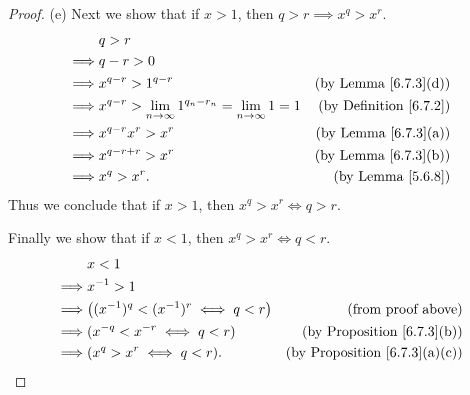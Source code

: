 \begin{proof}{(e)}
    Next we show that if \(x > 1\), then \(q > r \implies x^q > x^r\).
    \begin{align*}
                 & q > r                                                                                                          \\
        \implies & q - r > 0                                                                                                      \\
        \implies & x^{q - r} > 1^{q - r}                                                     & \text{(by Lemma \ref{6.7.3}(d))}   \\
        \implies & x^{q - r} > \lim_{n \to \infty} 1^{q_n - r_n} = \lim_{n \to \infty} 1 = 1 & \text{(by Definition \ref{6.7.2})} \\
        \implies & x^{q - r} x^r > x^r                                                       & \text{(by Lemma \ref{6.7.3}(a))}   \\
        \implies & x^{q - r + r} > x^r                                                       & \text{(by Lemma \ref{6.7.3}(b))}   \\
        \implies & x^q > x^r.                                                                & \text{(by Lemma \ref{5.6.8})}
    \end{align*}
    Thus we conclude that if \(x > 1\), then \(x^q > x^r \iff q > r\).

    Finally we show that if \(x < 1\), then \(x^q > x^r \iff q < r\).
    \begin{align*}
                 & x < 1                                                                                    \\
        \implies & x^{-1} > 1                                                                               \\
        \implies & \big((x^{-1})^q < (x^{-1})^r \iff q < r\big) & \text{(from proof above)}                 \\
        \implies & (x^{-q} < x^{-r} \iff q < r)                 & \text{(by Proposition \ref{6.7.3}(b))}    \\
        \implies & (x^q > x^r \iff q < r).                      & \text{(by Proposition \ref{6.7.3}(a)(c))}
    \end{align*}
\end{proof}


